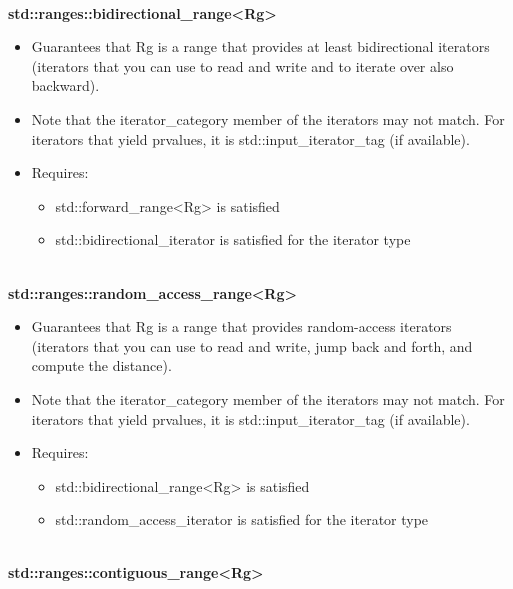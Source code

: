\noindent
\hspace*{\fill} \\ %
\textbf{std::ranges::bidirectional\_range<Rg>}

\begin{itemize}
\item
Guarantees that Rg is a range that provides at least bidirectional iterators (iterators that you can use to read and write and to iterate over also backward).

\item
Note that the iterator\_category member of the iterators may not match. For iterators that yield prvalues, it is std::input\_iterator\_tag (if available).

\item
Requires:

\begin{itemize}
\item
std::forward\_range<Rg> is satisfied

\item
std::bidirectional\_iterator is satisfied for the iterator type
\end{itemize}
\end{itemize}

\noindent
\hspace*{\fill} \\ %
\textbf{std::ranges::random\_access\_range<Rg>}

\begin{itemize}
\item
Guarantees that Rg is a range that provides random-access iterators (iterators that you can use to read and write, jump back and forth, and compute the distance).

\item
Note that the iterator\_category member of the iterators may not match. For iterators that yield prvalues, it is std::input\_iterator\_tag (if available).

\item
Requires:

\begin{itemize}
\item
std::bidirectional\_range<Rg> is satisfied

\item
std::random\_access\_iterator is satisfied for the iterator type
\end{itemize}
\end{itemize}

\noindent
\hspace*{\fill} \\ %
\textbf{std::ranges::contiguous\_range<Rg>}

